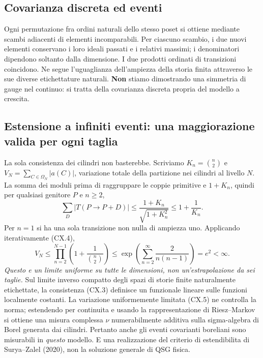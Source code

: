 \documentclass[11pt,a4paper]{article}
\begin{document}
\subsection*{Covarianza discreta ed eventi}
Ogni permutazione fra ordini naturali dello stesso poset si ottiene mediante scambi adiacenti di elementi incomparabili. Per ciascuno scambio, i due nuovi elementi conservano i loro ideali passati e i relativi massimi; i denominatori dipendono soltanto dalla dimensione. I due prodotti ordinati di transizioni coincidono. Ne segue l'uguaglianza dell'ampiezza della storia finita attraverso le sue diverse etichettature naturali. \textbf{Non} stiamo dimostrando una simmetria di gauge nel continuo: si tratta della covarianza discreta propria del modello a crescita.

\clearpage
\subsection*{Estensione a infiniti eventi: una maggiorazione valida per ogni taglia}
La sola consistenza dei cilindri non basterebbe. Scriviamo $K_n=\binom n2$ e $V_N=\sum_{C\in\Omega_N}|a(C)|$, variazione totale della partizione nei cilindri al livello $N$. La somma dei moduli prima di raggruppare le coppie primitive e $1+K_n$, quindi per qualsiasi genitore $P$ e $n\ge2$,
\begin{equation}
 \sum_{D}|T(P\to P+D)|\le\frac{1+K_n}{\sqrt{1+K_n^2}}
 \le 1+\frac1{K_n}.\tag{CX.4}
\end{equation}
Per $n=1$ si ha una sola transizione non nulla di ampiezza uno. Applicando iterativamente (CX.4),
\begin{equation}
 \boxed{V_N\le\prod_{n=2}^{N-1}\left(1+\frac1{\binom n2}\right)
 \le\exp\!\left(\sum_{n=2}^{\infty}\frac{2}{n(n-1)}\right)=e^2<\infty.}\tag{CX.5}
\end{equation}
\emph{Questo e un limite uniforme su tutte le dimensioni, non un'estrapolazione da sei taglie.} Sul limite inverso compatto degli spazi di storie finite naturalmente etichettate, la consistenza (CX.3) definisce un funzionale lineare sulle funzioni localmente costanti. La variazione uniformemente limitata (CX.5) ne controlla la norma; estendendo per continuita e usando la rappresentazione di Riesz--Markov si ottiene una misura complessa $\nu$ numerabilmente additiva sulla sigma-algebra di Borel generata dai cilindri. Pertanto anche gli eventi covarianti boreliani sono misurabili in \emph{questo} modello. E una realizzazione del criterio di estendibilita di Surya--Zalel (2020), non la soluzione generale di QSG fisica.
\end{document}
